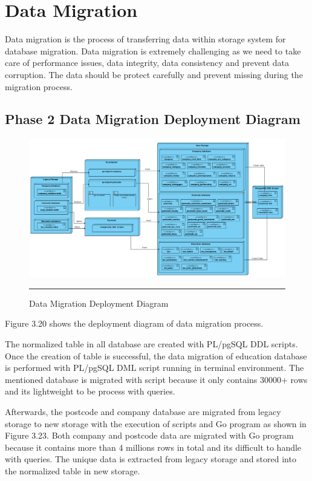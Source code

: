 \section{Data Migration} 

Data migration is the process of transferring data within storage system for database migration. \cite{data-migration-definition} Data migration is extremely challenging as we need to take care of performance issues, data integrity, data consistency and prevent data corruption. The data should be protect carefully and prevent missing during the migration process. 

\begin{landscape}
	\subsection{Phase 2 Data Migration Deployment Diagram} 
	\begin{figure}[H]
		\centering
		\includegraphics[width=1.4\textwidth]{FYP2/Chapter3/FYP2-data-migration-deployment.png}
		\rule{35em}{0.5pt}
		\caption[Data Migration Deployment Diagram]{Data Migration Deployment Diagram}
	\end{figure}
\end{landscape}

Figure 3.20 shows the deployment diagram of data migration process. 

The normalized table in all database are created with PL/pgSQL DDL scripts. Once the creation of table is successful, the data migration of education database is performed with PL/pgSQL DML script running in terminal environment. The mentioned database is migrated with script because it only contains 30000+ rows and its lightweight to be process with queries. 

Afterwards, the postcode and company database are migrated from legacy storage to new storage with the execution of scripts and Go program as shown in Figure 3.23. Both company and postcode data are migrated with Go program because it contains more than 4 millions rows in total and its difficult to handle with queries. The unique data is extracted from legacy storage and stored into the normalized table in new storage. 

